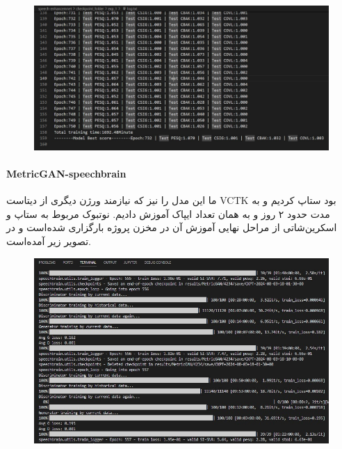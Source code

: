 \documentclass[fleqn]{report}
\begin{document}
\begin{figure}[h]

    \centering
    \includegraphics[width=\textwidth, keepaspectratio]{images/trained-screenshot.jpg}
    
    \caption{}
    \label{fig:trained-screen}
\end{figure}

\paragraph{MetricGAN-speechbrain}
ما این مدل را نیز که نیازمند ورژن دیگری از دیتاست VCTK بود ستاپ کردیم و به مدت حدود ۲ روز و به همان تعداد ایپاک آموزش دادیم.
نوتبوک مربوط به ستاپ و 
اسکرین‌شاتی از مراحل نهایی آموزش آن در مخزن پروژه بارگزاری شده‌است و در تصویر زیر آمده‌است.

\begin{figure}[h]

    \centering
    \includegraphics[width=\textwidth, keepaspectratio]{images/training-screenshot.jpg}
    
    \caption{}
    \label{fig:screen}
\end{figure}
\end{document}
